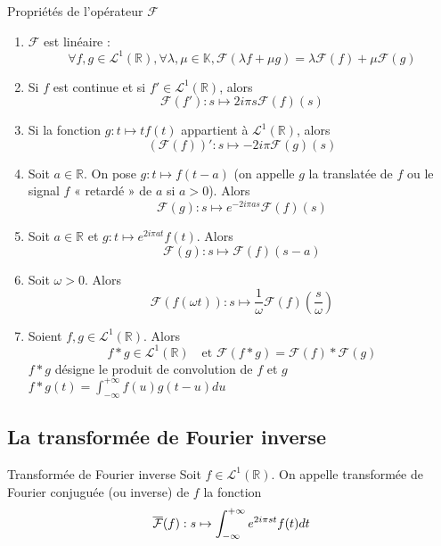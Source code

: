    \begin{prop}{Propriétés de l’opérateur $\mathcal{F}$}{}
        \begin{enumerate}
            \item $\mathcal{F}$ est linéaire :
            \[ \forall f,g \in \mathcal{L}^1(\mathbb{R}), \forall \lambda,\mu \in \mathbb{K}, \mathcal{F}(\lambda f + \mu g) = \lambda \mathcal{F}(f) + \mu \mathcal{F}(g) \] 
            \item Si $f$ est continue et si $f' \in \mathcal{L}^1(\mathbb{R})$, alors
            \[ \mathcal{F}(f') : s \mapsto 2 i \pi s \mathcal{F}(f)(s) \] 
            \item Si la fonction $g : t \mapsto t f(t)$ appartient à $\mathcal{L}^1(\mathbb{R})$, alors 
            \[ \left(\mathcal{F}(f)\right)' : s \mapsto -2i\pi \mathcal{F}(g)(s) \] 
            \item Soit $a \in \mathbb{R}$. On pose $g : t \mapsto f(t-a)$ (on appelle $g$ la translatée de $f$ ou le signal $f$ « retardé » de $a$ si $a > 0$). Alors
            \[ \mathcal{F}(g) : s \mapsto e^{-2i\pi a s} \mathcal{F}(f)(s) \] 
            \item Soit $a \in \mathbb{R}$ et $g : t \mapsto e^{2i \pi a t}f(t)$. Alors 
            \[ \mathcal{F}(g) : s \mapsto \mathcal{F}(f)(s-a) \]
            \item Soit $\omega > 0$. Alors
            \[ \mathcal{F}(f(\omega t)) : s \mapsto \frac{1}{\omega} \mathcal{F}(f)\left(\frac{s}{\omega}\right) \] 
            \item Soient $f,g \in \mathcal{L}^1(\mathbb{R})$. Alors
            \[ f * g \in \mathcal{L}^1(\mathbb{R}) \quad \text{et } \mathcal{F}(f * g) = \mathcal{F}(f) * \mathcal{F}(g) \]  
            $ f * g $ désigne le produit de convolution de $f$ et $g$ $f * g(t) = \int_{-\infty}^{+\infty} f(u)g(t-u)du$
        \end{enumerate}
    \end{prop}

\subsection{La transformée de Fourier inverse}

    \begin{defi}{Transformée de Fourier inverse}{}
        Soit $f \in \mathcal{L}^1(\mathbb{R})$. On appelle transformée de Fourier conjuguée (ou inverse) de $f$ la fonction 
        \[ \overline{\mathcal{F}}(f) : s \mapsto \int_{-\infty}^{+\infty} e^{2 i \pi st}f(t)dt \] 
    \end{defi}

